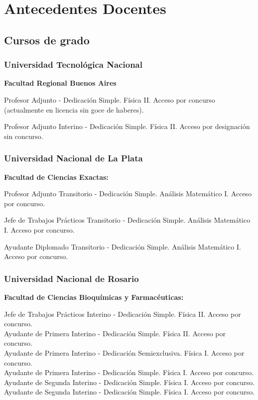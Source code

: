 \section{Antecedentes Docentes}

\subsection{Cursos de grado}

\subsubsection{Universidad Tecnológica Nacional}
\textbf{Facultad Regional Buenos Aires}

 Profesor Adjunto - Dedicación Simple. Física II. Acceso por concurso (actualmente en licencia sin goce de haberes).

 Profesor Adjunto Interino - Dedicación Simple. Física II. Acceso por designación sin concurso.

\subsubsection{Universidad Nacional de La Plata}
  
\textbf{Facultad de Ciencias Exactas:}
 
 Profesor Adjunto Transitorio - Dedicación Simple. Análisis Matemático I. Acceso por concurso.

 Jefe de Trabajos Prácticos Transitorio - Dedicación Simple. Análisis Matemático I. Acceso por concurso.

 Ayudante Diplomado Transitorio - Dedicación Simple. Análisis Matemático I. Acceso por concurso.

\subsubsection{Universidad Nacional de Rosario}
  
\textbf{Facultad de Ciencias Bioquímicas y Farmacéuticas:} 

 Jefe de Trabajos Prácticos Interino - Dedicación Simple. Física II. Acceso por concurso.\\
 Ayudante de Primera Interino - Dedicación Simple. Física II. Acceso por concurso. \\
 Ayudante de Primera Interino - Dedicación Semiexclusiva. Física I. Acceso por concurso. \\
 Ayudante de Primera Interino - Dedicación Simple. Física I. Acceso por concurso. \\
 Ayudante de Segunda Interino - Dedicación Simple. Física I. Acceso por concurso. \\
 Ayudante de Segunda Interino - Dedicación Simple. Física I. Acceso por concurso. \\

